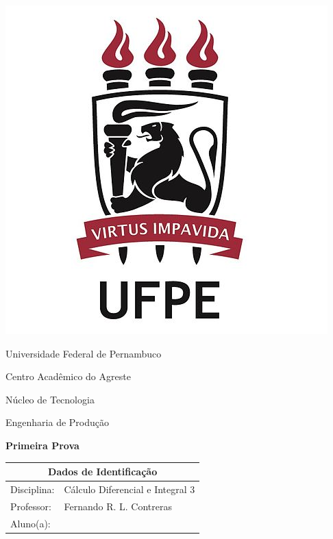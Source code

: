 \documentclass[oneside,a4paper,12pt]{article}
\newcommand{\universidade}{Universidade Federal de Pernambuco}
\newcommand{\centro}{Centro Acadêmico do Agreste}
\newcommand{\departamento}{Núcleo de Tecnologia}
\newcommand{\curso}{Engenharia de Produção}
\newcommand{\professor}{Fernando R. L. Contreras}
\newcommand{\disciplina}{Cálculo Diferencial e Integral 3}
\begin{document}
	\pagestyle{empty}
	
	\begin{center}
	\includegraphics[width=\linewidth/6]{logoUFPE.jpg}%
	 	\vspace{0pt}
	 	
		\universidade
		\par
		\centro
		\par
		\departamento
		\par
		\curso
		\par
		\vspace{08pt}
		\large \textbf{Primeira Prova}
		
	\end{center}
	
	\vspace{1pt}
	
	\begin{tabular}{ |l|p{12cm}| }
		
		\hline
		\multicolumn{2}{|c|}{\textbf{Dados de Identificação}} \\
			\hline
		Disciplina:        &    \disciplina          \\
		\hline
		Professor:         &    \professor           \\
	\hline
	Aluno(a):         &\\
	
		\hline
	\end{tabular}
	
\end{document}
